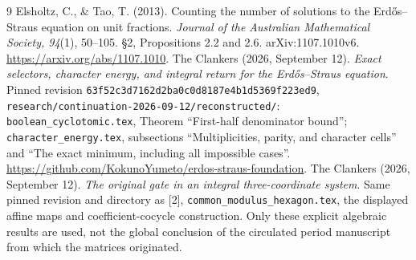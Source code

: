 \begin{thebibliography}{9}
 Elsholtz, C., \& Tao, T. (2013).
Counting the number of solutions to the Erd\H{o}s--Straus equation on unit fractions.
\emph{Journal of the Australian Mathematical Society, 94}(1), 50--105.
\S2, Propositions 2.2 and 2.6. arXiv:1107.1010v6.
\url{https://arxiv.org/abs/1107.1010}.
 The Clankers (2026, September 12).
\emph{Exact selectors, character energy, and integral return for the
Erd\H{o}s--Straus equation}. Pinned revision
\texttt{63f52c3d7162d2ba0c0d8187e4b1d5369f223ed9},
\texttt{research/continuation-2026-09-12/reconstructed/}:
\texttt{boolean\_cyclotomic.tex}, Theorem ``First-half denominator bound'';
\texttt{character\_energy.tex}, subsections ``Multiplicities, parity,
and character cells'' and ``The exact minimum, including all impossible cases''.
\url{https://github.com/KokunoYumeto/erdos-straus-foundation}.
 The Clankers (2026, September 12).
\emph{The original gate in an integral three-coordinate system}.
Same pinned revision and directory as [2],
\texttt{common\_modulus\_hexagon.tex}, the displayed affine maps and
coefficient-cocycle construction.
Only these explicit algebraic results are used, not the global conclusion
of the circulated period manuscript from which the matrices originated.
\end{thebibliography}
